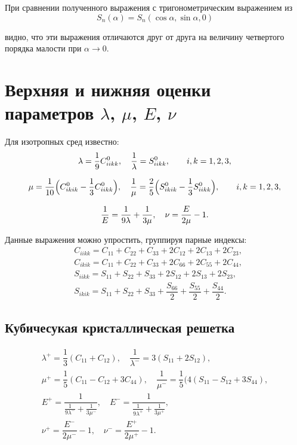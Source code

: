 \documentclass[12pt,a4paper]{article}
\begin{document}
 При сравнении полученного выражения с тригонометрическим выражением из 
 \[
	S_n(\alpha) = S_n(\cos \alpha, \sin \alpha, 0)
 \]

 \noindent видно, что эти выражения отличаются друг от друга на величину четвертого порядка малости при $\alpha \rightarrow 0$.

 \pagebreak

 \section{Верхняя и нижняя оценки параметров $\lambda$, $\mu$, $E$, $\nu$}

 Для изотропных сред известно:
 \begin{gather*}
    \lambda = \dfrac{1}{9}C^0_{iikk}, \quad \dfrac{1}{\lambda} = S^0_{iikk}, \qquad i, k = 1, 2, 3,
    \\[0.7em]
    \mu = \dfrac{1}{10}\Bigl( C^0_{ikik} - \dfrac{1}{3}C^0_{iikk} \Bigr), \quad \dfrac{1}{\mu} = \dfrac{2}{5}\Bigl( S^0_{ikik} - \dfrac{1}{3} S^0_{iikk} \Bigr), \qquad i, k = 1, 2, 3,
    \\[0.7em]
    \dfrac{1}{E} = \dfrac{1}{9 \lambda} + \dfrac{1}{3\mu}, \quad \nu = \dfrac{E}{2\mu} - 1.
 \end{gather*}

 Данные выражения можно упростить, группируя парные индексы:
 \[
    \begin{split}
        &C_{iikk} = C_{11} + C_{22} + C_{33} + 2C_{12} + 2C_{13} + 2C_{23},
        \\
        &C_{ikik} = C_{11} + C_{22} + C_{33} + 2C_{66} + 2C_{55} + 2C_{44},
        \\
        &S_{iikk} = S_{11} + S_{22} + S_{33} + 2S_{12} + 2S_{13} + 2S_{23},
        \\
        &S_{ikik} = S_{11} + S_{22} + S_{33} + \dfrac{S_{66}}{2} + \dfrac{S_{55}}{2} + \dfrac{S_{44}}{2}.
    \end{split}
 \]

 \subsection{Кубичесукая кристаллическая решетка}
 \begin{gather*}
    \lambda^+ = \dfrac{1}{3}(C_{11} + C_{12}), \quad \dfrac{1}{\lambda^-} = 3(S_{11} + 2S_{12}),
    \\[0.7em]
    \mu^+ = \dfrac{1}{5}(C_{11} - C_{12} + 3C_{44}), \quad \dfrac{1}{\mu^-} = \dfrac{1}{5}(4(S_{11} - S_{12} + 3S_{44}),
    \\[0.7em]
    E^+ = \dfrac{1}{\tfrac{1}{9 \lambda^-} + \tfrac{1}{3\mu^-}}, \quad E^- = \dfrac{1}{\tfrac{1}{9 \lambda^+} + \tfrac{1}{3\mu^+}},
    \\[0.7em]
    \nu^+ = \dfrac{E^-}{2\mu^-} - 1, \quad \nu^- = \dfrac{E^+}{2\mu^+} - 1.
 \end{gather*}
\end{document}
